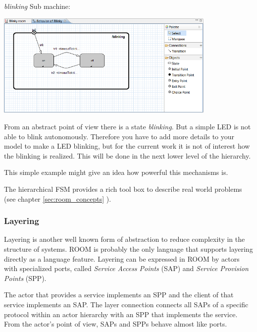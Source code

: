 \textit{blinking} Sub machine:

\includegraphics[width=0.8\textwidth]{images/020-Blinky151.png}

From an abstract point of view there is a state \textit{blinking}. But a simple LED is not able to blink 
autonomously. Therefore you have to add more details to your model to make a LED blinking, but for the 
current work it is not of interest how the blinking is realized. This will be done in the next lower level 
of the hierarchy. 

This simple example might give an idea how powerful this mechanisms is.

The hierarchical FSM provides a rich tool box to describe real world problems (see chapter \ref{sec:room_concepts} ).

\subsubsection*{Layering}

Layering is another well known form of abstraction to reduce complexity in the structure of systems. ROOM 
is probably the only language that supports layering directly as a language feature.
Layering can be expressed in ROOM by actors with specialized ports, called \emph{Service Access Points} 
(SAP) and \emph{Service Provision Points} (SPP).

The actor that provides a service implements an SPP and the client of that service implements an SAP. The 
layer connection connects all SAPs of a specific protocol within an actor hierarchy with an SPP that 
implements the service. From the actor's point of view, SAPs and SPPs behave almost like ports.

